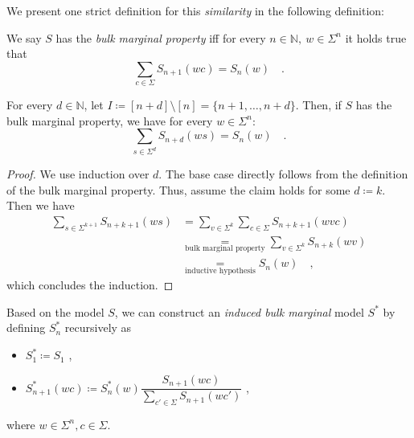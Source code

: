 \documentclass[../../main.tex]{subfiles}
\begin{document}
    We present one strict definition for this \emph{similarity} in the following definition:

    \begin{definition}
        We say $S$ has the \emph{bulk marginal property} iff for every $n \in \mathbb{N}, \ w \in \Sigma^{n}$ it holds true that
        \[
            \sum_{c \in \Sigma} S_{n + 1}(wc) = S_n(w) \quad .
        \]
    \end{definition}

    \begin{lemma}
        \label{lemma:random_variables_do_not_change_with_future_models}
        For every $d \in \mathbb{N}$, let $I \coloneqq [n + d] \setminus [n] = \{ n+1, \dots, n + d \}$. Then, if $S$ has the bulk marginal property, we have for every $w \in \Sigma^{n}$:
        \[
            \sum_{s \in \Sigma^d} S_{n + d}(ws) = S_n(w) \quad .
        \]
    \end{lemma}
    \begin{proof}
        We use induction over $d$. The base case directly follows from the definition of the bulk marginal property. Thus, assume the claim holds for some $d \coloneqq k$. Then we have
        \begin{align*}
            \sum_{s \in \Sigma^{k+1}} S_{n + k + 1}(ws) 
            &= \sum_{v \in \Sigma^k} \sum_{c \in \Sigma} S_{n + k + 1}(wvc) \\
            &\underset{\text{bulk marginal property}}{=} \sum_{v \in \Sigma^k} S_{n+k}(wv) \\
            &\underset{\text{inductive hypothesis}}{=} S_n(w) \quad ,
        \end{align*}
        which concludes the induction.
    \end{proof}

    \begin{definition}
        \label{def:induced_bulk_marginal_model}
        Based on the model $S$, we can construct an \emph{induced bulk marginal} model $S^*$ by defining $S_n^*$ recursively as 
        \begin{itemize}
            \item $S_1^* \coloneqq S_1$ ,
            \item $S_{n + 1}^*(wc) \coloneqq S_n^*(w) \dfrac{S_{n+1}(wc)}{\sum_{c' \in \Sigma} S_{n+1}(wc')}$ ,
        \end{itemize}
        where $w \in \Sigma^n, c \in \Sigma$.
    \end{definition}
\end{document}
